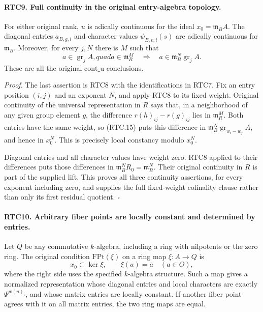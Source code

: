 \paragraph{RTC9. Full continuity in the original entry-algebra topology.}
\label{claim:RTC9}
For either original rank, \(u\) is adically continuous for the
ideal \(x_0=\mathfrak m_BA\).  The diagonal entries
\(a_{B,g,i}\) and character values \(\psi_{B,v,i}(s)\) are
adically continuous for \(\mathfrak m_B\).  Moreover, for every
\(j,N\) there is \(M\) such that
\[
 a\in\operatorname{gr}_jA,quad a\in\mathfrak m_R^M
       \quad\Longrightarrow\quad
 a\in\mathfrak m_B^N\operatorname{gr}_jA.
                                                        \tag{RTC.15}
\]
These are all the original \(\mathrm{cont\_u}\) conclusions.

\emph{Proof.}
The last assertion is RTC8 with the identifications in RTC7.
Fix an entry position \((i,j)\) and an exponent \(N\), and
apply RTC8 to its fixed weight.  Original continuity of the
universal representation in \(R\) says that, in a neighborhood
of any given group element \(g\), the difference
\(r(h)_{ij}-r(g)_{ij}\) lies in \(\mathfrak m_R^M\).
Both entries have the same weight, so (RTC.15) puts this difference
in \(\mathfrak m_B^N\operatorname{gr}_{w_i-w_j}A\), and hence
in \(x_0^N\).  This is precisely local constancy modulo
\(x_0^N\).

Diagonal entries and all character values have weight zero.
RTC8 applied to their differences puts those differences in
\(\mathfrak m_B^N R_0=\mathfrak m_B^N\).  Their original
continuity in \(R\) is part of the supplied lift.  This proves
all three continuity assertions, for every exponent including zero,
and supplies the full fixed-weight cofinality clause rather than
only its first residual quotient. \hfill\(\square\)

\paragraph{RTC10. Arbitrary fiber points are locally constant and determined by entries.}
\label{claim:RTC10}
Let \(Q\) be any commutative \(k\)-algebra, including a ring with
nilpotents or the zero ring.  The original condition
\(\mathrm{FPt}(\xi)\) on a ring map \(\xi:A\to Q\) is
\[
 x_0\subset\ker\xi,\qquad
 \xi(a)=\bar a\quad(a\in O),
                                                        \tag{RTC.16}
\]
where the right side uses the specified \(k\)-algebra structure.
Such a map gives a normalized representation whose diagonal entries
and local characters are exactly \(\Psi^{w(n)_i}\), and whose
matrix entries are locally constant.  If another fiber point agrees
with it on all matrix entries, the two ring maps are equal.

